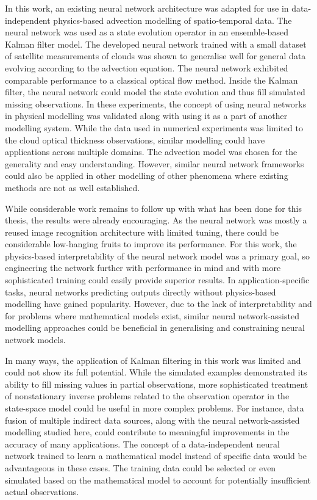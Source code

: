 In this work, an existing neural network architecture was adapted for use in data-independent physics-based advection modelling of spatio-temporal data.
The neural network was used as a state evolution operator in an ensemble-based Kalman filter model.
The developed neural network trained with a small dataset of satellite measurements of clouds was shown to generalise well for general data evolving according to the advection equation.
The neural network exhibited comparable performance to a classical optical flow method.
Inside the Kalman filter, the neural network could model the state evolution and thus fill simulated missing observations.
In these experiments, the concept of using neural networks in physical modelling was validated along with using it as a part of another modelling system.
While the data used in numerical experiments was limited to the cloud optical thickness observations, similar modelling could have applications across multiple domains.
The advection model was chosen for the generality and easy understanding.
However, similar neural network frameworks could also be applied in other modelling of other phenomena where existing methods are not as well established.

While considerable work remains to follow up with what has been done for this thesis, the results were already encouraging.
As the neural network was mostly a reused image recognition architecture with limited tuning, there could be considerable low-hanging fruits to improve its performance.
For this work, the physics-based interpretability of the neural network model was a primary goal, so engineering the network further with performance in mind and with more sophisticated training could easily provide superior results.
In application-specific tasks, neural networks predicting outputs directly without physics-based modelling have gained popularity.
However, due to the lack of interpretability and for problems where mathematical models exist, similar neural network-assisted modelling approaches could be beneficial in generalising and constraining neural network models.

In many ways, the application of Kalman filtering in this work was limited and could not show its full potential.
While the simulated examples demonstrated its ability to fill missing values in partial observations, more sophisticated treatment of nonstationary inverse problems related to the observation operator in the state-space model could be useful in more complex problems.
For instance, data fusion of multiple indirect data sources, along with the neural network-assisted modelling studied here, could contribute to meaningful improvements in the accuracy of many applications.
The concept of a data-independent neural network trained to learn a mathematical model instead of specific data would be advantageous in these cases.
The training data could be selected or even simulated based on the mathematical model to account for potentially insufficient actual observations.

